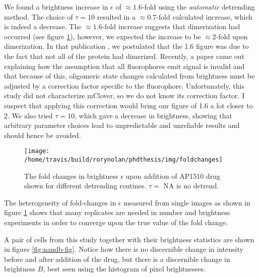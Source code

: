 \documentclass[12pt,]{book}
\theoremstyle{definition}
\theoremstyle{definition}
\theoremstyle{definition}
\theoremstyle{remark}
\begin{document}
We found a brightness increase in \(\epsilon\) of \(\approx 1.6\)-fold
using the \emph{automatic} detrending method. The choice of \(\tau=10\)
resulted in a \(\approx 0.7\)-fold calculated increase, which is indeed
a decrease. The \(\approx 1.6\)-fold increase suggests that dimerization
had occurred (see figure \ref{fig:FKBPfoldchanges}), however, we
expected the increase to be \(\approx 2\)-fold upon dimerization. In
that publication \citep{nandb}, we postulated that the 1.6 figure was
due to the fact that not all of the protein had dimerized. Recently, a
paper came out \citep{fpcompare} explaining how the assumption that all
fluorophores emit signal is invalid and that because of this, oligomeric
state changes calculated from brightness must be adjusted by a
correction factor specific to the fluorophore. Unfortunately, this study
did not characterize mClover, so we do not know its correction factor. I
suspect that applying this correction would bring our figure of 1.6 a
lot closer to 2. We also tried \(\tau=10\), which gave a decrease in
brightness, showing that arbitrary parameter choices lead to
unpredictable and unreliable results and should hence be avoided.





\begin{figure}

\texttt{[image: /home/travis/build/rorynolan/phdthesis/img/foldchanges]} \hfill{}

\caption{The fold changes in brightness
\(\epsilon\) upon addition of AP1510 drug shown for different detrending
routines. \(\tau=\) NA is no detrend.}\label{fig:FKBPfoldchanges}
\end{figure}

The heterogeneity of fold-changes in \(\epsilon\) measured from single
images as shown in figure \ref{fig:FKBPfoldchanges} shows that many
replicates are needed in number and brightness experiments in order to
converge upon the true value of the fold change.

A pair of cells from this study together with their brightness
statistics are shown in figure \ref{fig:nandb-fig}. Notice how there is
no discernible change in intensity before and after addition of the
drug, but there is a discernible change in brightness \(B\), best seen
using the histogram of pixel brightnesses.
\end{document}
